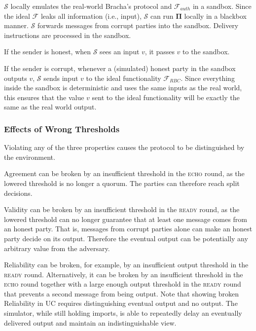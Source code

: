 $\mathcal{S}$ locally emulates the real-world Bracha's protocol and $\mathcal{F}_{auth}$ in a sandbox. Since the ideal $\mathcal{F}$ leaks all information (i.e., input), $\mathcal{S}$ can run $\mathbf{\Pi}$ locally in a blackbox manner. $\mathcal{S}$ forwards messages from corrupt parties into the sandbox. Delivery instructions are processed in the sandbox.

If the sender is honest, when $\mathcal{S}$ sees an input $v$, it passes $v$ to the sandbox.

If the sender is corrupt, whenever a (simulated) honest party in the sandbox outputs $v$, $\mathcal{S}$ sends input $v$ to the ideal functionality $\mathcal{F}_{RBC}$. Since everything inside the sandbox is deterministic and uses the same inputs as the real world, this ensures that the value $v$ sent to the ideal functionality will be exactly the same as the real world output.

\subsubsection{Effects of Wrong Thresholds}
Violating any of the three properties causes the protocol to be distinguished by the environment.

Agreement can be broken by an insufficient threshold in the \textsc{echo} round, as the lowered threshold is no longer a quorum. The parties can therefore reach split decisions.

Validity can be broken by an insufficient threshold in the \textsc{ready} round, as the lowered threshold can no longer guarantee that at least one message comes from an honest party. That is, messages from corrupt parties alone can make an honest party decide on its output. Therefore the eventual output can be potentially any arbitrary value from the adversary.

Reliability can be broken, for example, by an insufficient output threshold in the \textsc{ready} round. Alternatively, it can be broken by an insufficient threshold in the \textsc{echo} round together with a large enough output threshold in the \textsc{ready} round that prevents a second message from being output. Note that showing broken Reliability in UC requires distinguishing eventual output and no output. The simulator, while still holding imports, is able to repeatedly delay an eventually delivered output and maintain an indistinguishable view.